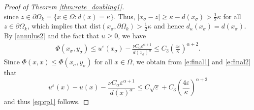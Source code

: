 \documentclass[12pt,reqno]{amsart}
\numberwithin{figure}{section}
\theoremstyle{plain}
\theoremstyle{remark}
\numberwithin{equation}{section}
\begin{document}
\begin{proof}[Proof of Theorem \ref{thm:rate_doubling1}]
\begin{equation*}
\end{equation*}
since $z\in \partial\Omega_k = \{x \in \Omega: d(x) = \kappa\}$. Thus, $|x_\sigma - z| \geq \kappa - d(x_\sigma) > \frac{1}{2}\kappa$ for all $z\in \partial\Omega_k$, which implies that $\mathrm{dist}(x_\sigma,\partial\Omega_k)>\frac{1}{2}\kappa$ and hence $d_\kappa(x_\sigma) = d(x_\sigma)$. By \eqref{annulus2} and the fact that $u \geq 0$, we have
\begin{align}
    \Phi(x_\sigma, y_\sigma)\leq u^\varepsilon(x_\sigma) - \frac{\nu C_\alpha \varepsilon^{\alpha+1}}{d(x_\sigma)^\alpha} \leq C_3\left(\frac{4\varepsilon}{\kappa}\right)^{\alpha+2} \label{e:final2}.
\end{align}
\noindent
Since $\Phi(x,x) \leq \Phi(x_\sigma,y_\sigma)$ for all $x\in \Omega$, we obtain from \eqref{e:final1} and \eqref{e:final2} that
\begin{equation*}
    u^\varepsilon(x)-u(x)-\frac{\nu C_\alpha  \varepsilon^{\alpha+1}}{d(x)^\alpha} \leq C\sqrt{\varepsilon} +C_3\left(\frac{4\varepsilon}{\kappa}\right)^{\alpha+2}
\end{equation*}
and thus \eqref{eq:cp1} follows. 


\end{proof}
\end{document}
